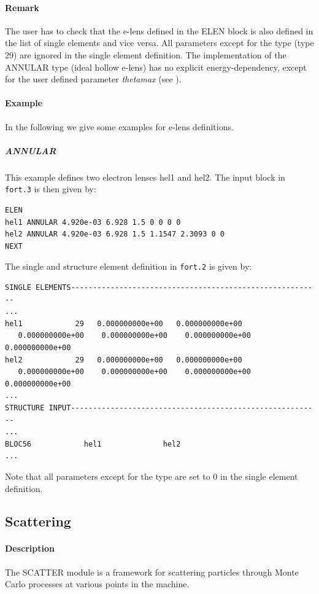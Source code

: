 \paragraph{Remark} The user has to check that the e-lens defined in the ELEN block is also defined in the list of single elements and vice versa. All parameters except for the type (type 29) are ignored in the single element definition.
The implementation of the ANNULAR type (ideal hollow e-lens) has no explicit energy-dependency, except for the user defined parameter \emph{thetamax} (see \cite{sixphys}).

\paragraph{Example} In the following we give some examples for e-lens definitions.

\subparagraph{ANNULAR} This example defines two electron lenses hel1 and hel2. The input block in \verb|fort.3| is then given by:
\begin{verbatim}
ELEN
hel1 ANNULAR 4.920e-03 6.928 1.5 0 0 0 0
hel2 ANNULAR 4.920e-03 6.928 1.5 1.1547 2.3093 0 0
NEXT
\end{verbatim}
The single and structure element definition in \verb|fort.2| is given by:
\begin{verbatim}
SINGLE ELEMENTS---------------------------------------------------------
...
hel1            29   0.000000000e+00   0.000000000e+00 
   0.000000000e+00    0.000000000e+00    0.000000000e+00    0.000000000e+00
hel2            29   0.000000000e+00   0.000000000e+00   
   0.000000000e+00    0.000000000e+00    0.000000000e+00    0.000000000e+00
...
STRUCTURE INPUT---------------------------------------------------------
...
BLOC56            hel1              hel2
...
\end{verbatim}
Note that all parameters except for the type are set to 0 in the single element definition.

\subsection{Scattering} \label{sec:scatter}

\paragraph{Description}
The SCATTER module is a framework for scattering particles through Monte Carlo processes at various points in the machine.

